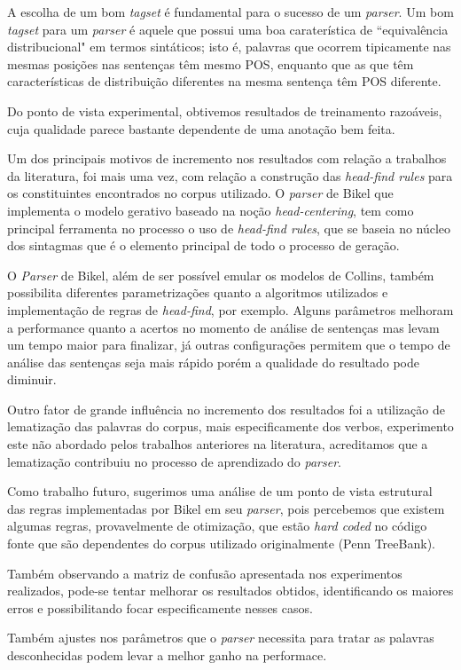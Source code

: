 
A escolha de um bom \emph{tagset} é fundamental para o sucesso de um \emph{parser}. Um bom \emph{tagset} para um \emph{parser} é aquele que possui uma boa caraterística de ``equivalência distribucional" em termos sintáticos; isto é, palavras que ocorrem tipicamente nas mesmas posições nas sentenças têm mesmo POS, enquanto que as que têm características de distribuição diferentes na mesma sentença têm POS diferente. 

Do ponto de vista experimental, obtivemos resultados de treinamento razoáveis, cuja qualidade parece bastante dependente de uma anotação bem feita. 

Um dos principais motivos de incremento nos resultados com relação a trabalhos da literatura, foi mais uma vez, com relação a construção das \emph{head-find rules} para os constituintes encontrados no corpus utilizado. O \emph{parser} de Bikel que implementa o modelo gerativo baseado na noção \emph{head-centering}, tem como principal ferramenta no processo o uso de \emph{head-find rules}, que se baseia no núcleo dos sintagmas que é o elemento principal de todo o processo de geração.

O \emph{Parser} de Bikel, além de ser possível emular os modelos de Collins, também possibilita diferentes parametrizações quanto a algoritmos utilizados e implementação de regras de \emph{head-find}, por exemplo. Alguns parâmetros melhoram a performance quanto a acertos no momento de análise de sentenças mas levam um tempo maior para finalizar, já outras configurações permitem que o tempo de análise das sentenças seja mais rápido porém a qualidade do resultado pode diminuir.

Outro fator de grande influência no incremento dos resultados foi a utilização de lematização das palavras do corpus, mais especificamente dos verbos, experimento este não abordado pelos trabalhos anteriores na literatura, acreditamos que a lematização contribuiu no processo de aprendizado do \emph{parser}.

Como trabalho futuro, sugerimos uma análise de um ponto de vista estrutural das regras implementadas por Bikel em seu \emph{parser}, pois percebemos que existem algumas regras, provavelmente de otimização, que estão \emph{hard coded} no código fonte que são dependentes do corpus utilizado originalmente (Penn TreeBank). 

Também observando a matriz de confusão apresentada nos experimentos realizados, pode-se tentar melhorar os resultados obtidos, identificando os maiores erros e possibilitando focar especificamente nesses casos. 

Também ajustes nos parâmetros que o \emph{parser} necessita para tratar as palavras desconhecidas podem levar a melhor ganho na performace.
